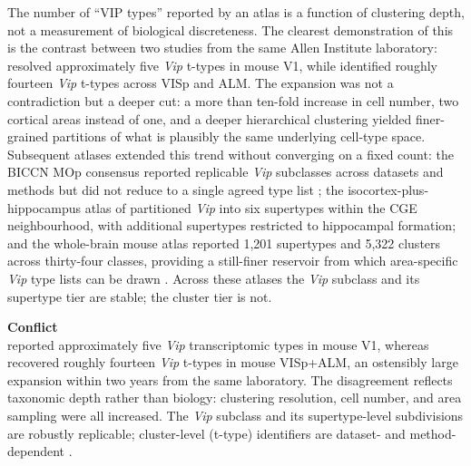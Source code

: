 \documentclass[11pt]{article}
\begin{document}
The number of ``VIP types'' reported by an atlas is a function of clustering depth, not a measurement of biological discreteness. The clearest demonstration of this is the contrast between two studies from the same Allen Institute laboratory: \citet{Tasic2016} resolved approximately five \textit{Vip} t-types in mouse V1, while \citet{Tasic2018} identified roughly fourteen \textit{Vip} t-types across VISp and ALM. The expansion was not a contradiction but a deeper cut: a more than ten-fold increase in cell number, two cortical areas instead of one, and a deeper hierarchical clustering yielded finer-grained partitions of what is plausibly the same underlying cell-type space. Subsequent atlases extended this trend without converging on a fixed count: the BICCN MOp consensus reported replicable \textit{Vip} subclasses across datasets and methods but did not reduce to a single agreed type list \citep{Yao2021b}; the isocortex-plus-hippocampus atlas of \citet{Yao2021a} partitioned \textit{Vip} into six supertypes within the CGE neighbourhood, with additional supertypes restricted to hippocampal formation; and the whole-brain mouse atlas reported 1,201 supertypes and 5,322 clusters across thirty-four classes, providing a still-finer reservoir from which area-specific \textit{Vip} type lists can be drawn \citep{Yao2023}. Across these atlases the \textit{Vip} subclass and its supertype tier are stable; the cluster tier is not.

\begin{framed}
\textbf{Conflict}\\
\citet{Tasic2016} reported approximately five \textit{Vip} transcriptomic types in mouse V1, whereas \citet{Tasic2018} recovered roughly fourteen \textit{Vip} t-types in mouse VISp+ALM, an ostensibly large expansion within two years from the same laboratory. The disagreement reflects taxonomic depth rather than biology: clustering resolution, cell number, and area sampling were all increased. The \textit{Vip} subclass and its supertype-level subdivisions are robustly replicable; cluster-level (t-type) identifiers are dataset- and method-dependent \citep{Yao2021a, Yao2021b, Yao2023, Crow2018}.
\end{framed}
\end{document}
